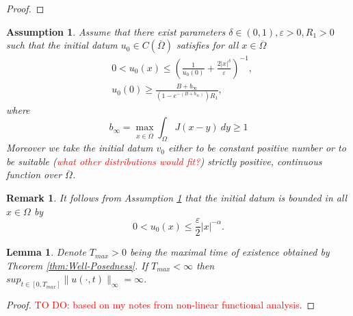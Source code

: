 \documentclass[12pt, a4paper]{article}
\theoremstyle{break}
\theoremstyle{break}
\theoremstyle{break}
\newtheorem{asm}{Assumption}[section]
\theoremstyle{break}
\newtheorem{rem}{Remark}[section]
\theoremstyle{break}
\newtheorem{lem}{Lemma}[section]
\theoremstyle{break}
\theoremstyle{break}
\begin{document}
\begin{proof}
    
\end{proof}
\begin{asm}
    \label{asm:InitialDatumSpikes}
    Assume that there exist parameters $\delta \in (0,1), \varepsilon > 0, R_1 > 0$ such that the initial datum $u_0 \in C(\overline{\Omega})$ satisfies for all $x \in \overline{\Omega}$
    \begin{align}
        &0 < u_0(x) \leq \left( \frac{1}{u_0(0)} + \frac{2 |x|^\delta}{\varepsilon} \right)^{-1}, \\
        &u_0(0) \geq \frac{B + b_\infty}{(1-e^{-(B + b_\infty)}) R_1},
    \end{align}
    where
    $$b_\infty = \max_{x \in \overline{\Omega}} \int_\Omega J(x-y)\:dy \geq 1$$
    Moreover we take the initial datum $v_0$ either to be constant positive number or to be suitable (\textcolor{red}{what other distributions would fit?}) strictly positive, continuous function over $\overline{\Omega}$.
\end{asm}
\begin{rem}
    It follows from Assumption \ref{asm:InitialDatumSpikes} that the initial datum is bounded in all $x \in \Omega$ by
    \begin{equation*}
        0 < u_0(x) \leq \frac{\varepsilon}{2} |x|^{-\alpha}.
    \end{equation*}
\end{rem}
\begin{lem}
    Denote $T_{max} > 0$ being the maximal time of existence obtained by Theorem \ref{thm:Well-Posedness}. If $T_{max} < \infty$ then $sup_{t \in [0, T_{max}]} \|u(\cdot, t)\|_\infty
    = \infty$.
\end{lem}
\begin{proof}
    \textcolor{red}{TO DO: based on my notes from non-linear functional analysis}.
\end{proof}
\end{document}
